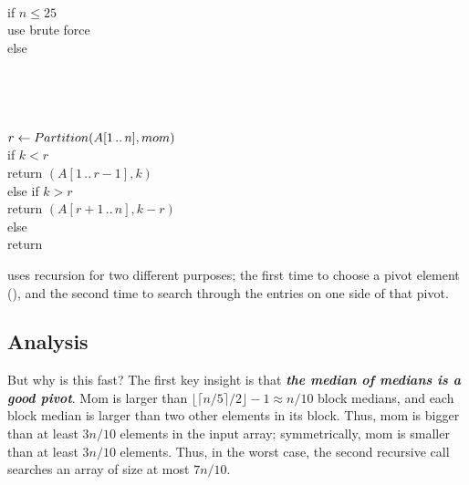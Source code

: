\begin{pseudocode}
\\
if $n \le 25$ \\
\Indent use brute force\\
else\\
\Indent {}\\
\Indent {}\\
\Indent\Indent {} \\
\Indent {} \\[2pt]
\Indent $r \gets Partition(A[1\,..\,n], mom)$\\[2pt]
\Indent if $k < r$\\
\Indent\Indent return $(A[1\,..\,r-1], k)$ \\
\Indent else if $k > r$\\
\Indent\Indent return $(A[r+1\,..\,n], k-r)$ \\
\Indent else\\
\Indent\Indent return 
\end{pseudocode}

 uses recursion for two different purposes; the first time to choose a pivot element (), and the second time to search through the entries on one side of that pivot.

\subsection{Analysis}
But why is this fast? The first key insight is that \textbf{\textit{the median of medians is a good pivot}}. Mom is larger than $\bigl\lfloor \lceil n/5\rceil/2 \bigr\rfloor - 1 \approx n/10$ block medians, and each block median is larger than two other elements in its block. Thus, mom is bigger than at least $3n/10$ elements in the input array; symmetrically, mom is smaller than at least $3n/10$ elements. Thus, in the worst case, the second recursive call searches an array of size at most $7n/10$.

